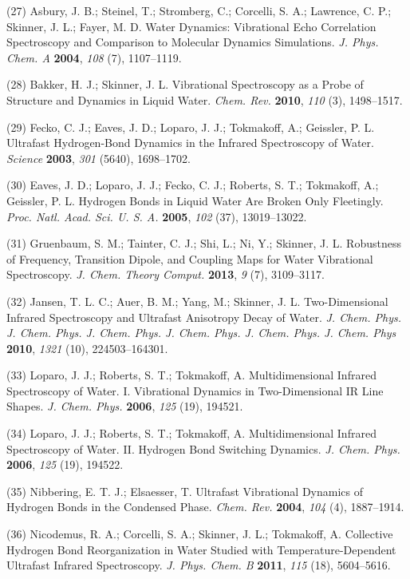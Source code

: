 \documentclass[]{article}
\begin{document}
(27) Asbury, J. B.; Steinel, T.; Stromberg, C.; Corcelli, S. A.;
Lawrence, C. P.; Skinner, J. L.; Fayer, M. D. Water Dynamics:
Vibrational Echo Correlation Spectroscopy and Comparison to Molecular
Dynamics Simulations. \emph{J. Phys. Chem. A} \textbf{2004}, \emph{108}
(7), 1107--1119.

(28) Bakker, H. J.; Skinner, J. L. Vibrational Spectroscopy as a Probe
of Structure and Dynamics in Liquid Water. \emph{Chem. Rev.}
\textbf{2010}, \emph{110} (3), 1498--1517.

(29) Fecko, C. J.; Eaves, J. D.; Loparo, J. J.; Tokmakoff, A.; Geissler,
P. L. Ultrafast Hydrogen-Bond Dynamics in the Infrared Spectroscopy of
Water. \emph{Science} \textbf{2003}, \emph{301} (5640), 1698--1702.

(30) Eaves, J. D.; Loparo, J. J.; Fecko, C. J.; Roberts, S. T.;
Tokmakoff, A.; Geissler, P. L. Hydrogen Bonds in Liquid Water Are Broken
Only Fleetingly. \emph{Proc. Natl. Acad. Sci. U. S. A.} \textbf{2005},
\emph{102} (37), 13019--13022.

(31) Gruenbaum, S. M.; Tainter, C. J.; Shi, L.; Ni, Y.; Skinner, J. L.
Robustness of Frequency, Transition Dipole, and Coupling Maps for Water
Vibrational Spectroscopy. \emph{J. Chem. Theory Comput.} \textbf{2013},
\emph{9} (7), 3109--3117.

(32) Jansen, T. L. C.; Auer, B. M.; Yang, M.; Skinner, J. L.
Two-Dimensional Infrared Spectroscopy and Ultrafast Anisotropy Decay of
Water. \emph{J. Chem. Phys. J. Chem. Phys. J. Chem. Phys. J. Chem. Phys.
J. Chem. Phys. J. Chem. Phys} \textbf{2010}, \emph{1321} (10),
224503--164301.

(33) Loparo, J. J.; Roberts, S. T.; Tokmakoff, A. Multidimensional
Infrared Spectroscopy of Water. I. Vibrational Dynamics in
Two-Dimensional IR Line Shapes. \emph{J. Chem. Phys.} \textbf{2006},
\emph{125} (19), 194521.

(34) Loparo, J. J.; Roberts, S. T.; Tokmakoff, A. Multidimensional
Infrared Spectroscopy of Water. II. Hydrogen Bond Switching Dynamics.
\emph{J. Chem. Phys.} \textbf{2006}, \emph{125} (19), 194522.

(35) Nibbering, E. T. J.; Elsaesser, T. Ultrafast Vibrational Dynamics
of Hydrogen Bonds in the Condensed Phase. \emph{Chem. Rev.}
\textbf{2004}, \emph{104} (4), 1887--1914.

(36) Nicodemus, R. A.; Corcelli, S. A.; Skinner, J. L.; Tokmakoff, A.
Collective Hydrogen Bond Reorganization in Water Studied with
Temperature-Dependent Ultrafast Infrared Spectroscopy. \emph{J. Phys.
Chem. B} \textbf{2011}, \emph{115} (18), 5604--5616.
\end{document}
